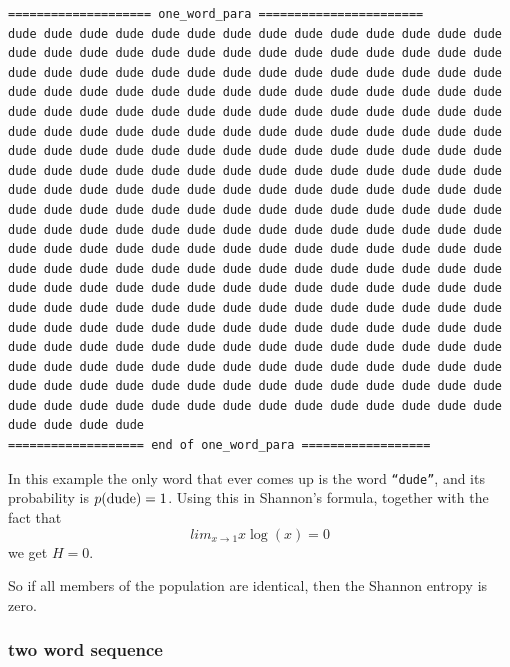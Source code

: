 \documentclass[11pt]{article}
\begin{document}
\begin{tiny}
\begin{verbatim}
==================== one_word_para =======================
dude dude dude dude dude dude dude dude dude dude dude dude dude dude
dude dude dude dude dude dude dude dude dude dude dude dude dude dude
dude dude dude dude dude dude dude dude dude dude dude dude dude dude
dude dude dude dude dude dude dude dude dude dude dude dude dude dude
dude dude dude dude dude dude dude dude dude dude dude dude dude dude
dude dude dude dude dude dude dude dude dude dude dude dude dude dude
dude dude dude dude dude dude dude dude dude dude dude dude dude dude
dude dude dude dude dude dude dude dude dude dude dude dude dude dude
dude dude dude dude dude dude dude dude dude dude dude dude dude dude
dude dude dude dude dude dude dude dude dude dude dude dude dude dude
dude dude dude dude dude dude dude dude dude dude dude dude dude dude
dude dude dude dude dude dude dude dude dude dude dude dude dude dude
dude dude dude dude dude dude dude dude dude dude dude dude dude dude
dude dude dude dude dude dude dude dude dude dude dude dude dude dude
dude dude dude dude dude dude dude dude dude dude dude dude dude dude
dude dude dude dude dude dude dude dude dude dude dude dude dude dude
dude dude dude dude dude dude dude dude dude dude dude dude dude dude
dude dude dude dude dude dude dude dude dude dude dude dude dude dude
dude dude dude dude dude dude dude dude dude dude dude dude dude dude
dude dude dude dude dude dude dude dude dude dude dude dude dude dude
dude dude dude dude
=================== end of one_word_para ==================
\end{verbatim}
\end{tiny}

In this example the only word that ever comes up is the word
\texttt{``dude''}, and its probability is $p({\rm dude}) = 1$.  Using
this in Shannon's formula, together with the fact that
$$lim_{x\rightarrow 1}x \log(x) = 0$$
we get $H = 0$.

So if all members of the population are identical, then the Shannon
entropy is zero.

\subsubsection{two word sequence}


\end{document}
